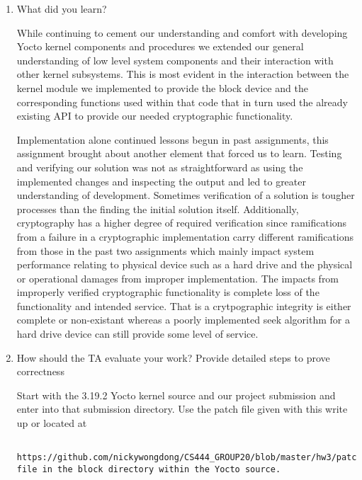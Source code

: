 \documentclass[onecolumn, draftclsnofoot,10pt, compsoc]{IEEEtran}
\begin{document}
\begin{enumerate}
\begin{singlespace}
 
    \end{singlespace}
    
    \item What did you learn?
    \begin{singlespace} 
    While continuing to cement our understanding and comfort with developing Yocto kernel components and procedures we extended our general understanding of low level system components and their interaction with other kernel subsystems. This is most evident in the interaction between the kernel module we implemented to provide the block device and the corresponding functions used within that code that in turn used the already existing API to provide our needed cryptographic functionality.
    
    Implementation alone continued lessons begun in past assignments, this assignment brought about another element that forced us to learn. Testing and verifying our solution was not as straightforward as using the implemented changes and inspecting the output and led to greater understanding of development. Sometimes verification of a solution is tougher processes than the finding the initial solution itself. Additionally, cryptography has a higher degree of required verification since ramifications from a failure in a cryptographic implementation carry different ramifications from those in the past two assignments which mainly impact system performance relating to physical device such as a hard drive and the physical or operational damages from improper implementation. The impacts from improperly verified cryptographic functionality is complete loss of the functionality and intended service. That is a crytpographic integrity is either complete or non-existant whereas a poorly implemented seek algorithm for a hard drive device can still provide some level of service. 


    \end{singlespace}
    \item How should the TA evaluate your work? Provide detailed steps to prove correctness
    \begin{singlespace}
    Start with the 3.19.2 Yocto kernel source and our project submission and enter into that submission directory. Use the patch file given with this write up or located at 
    \end{singlespace}
    \begin{lstlisting}
    https://github.com/nickywongdong/CS444_GROUP20/blob/master/hw3/patch/hw3.patchc file in the block directory within the Yocto source.
    \end{lstlisting}

\end{enumerate}
\end{document}
